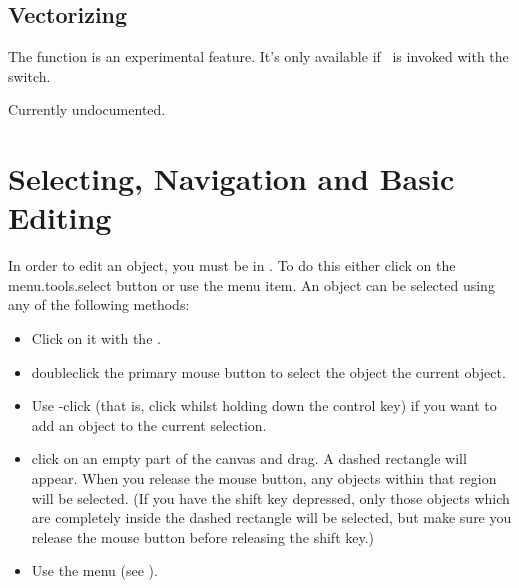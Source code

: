 
\section{Vectorizing}\label{sec:vectorize}

The  function is an experimental
feature. It's only available if \FlowframTk\ is invoked with
the  switch.

Currently undocumented.


\chapter{Selecting, Navigation and Basic Editing}\label{sec:selectobjects}


In order to edit an \gls{object}, you must be in \selectmode. To do
this either click on the \gls{menu.tools.select} button or use the 
 menu item. An \gls*{object} can
be selected using any of the following methods:
\begin{itemize}
\item Click on it with the .

\item \Gls{doubleclick} the primary mouse button to
select the \gls*{object}  the current \gls*{object}.

\item Use -click (that is, \gls{click} whilst holding down the control
 key) if you want to add an \gls*{object} to the current
selection.

\item \Gls{click} on an empty part of the \gls{canvas} and
drag. A dashed rectangle will appear. When you release the mouse
button, any \glspl*{object} within that
region will be selected. (If you have the shift  key depressed,
only those objects which are completely inside the dashed
rectangle will be selected, but make sure you release the mouse
button before releasing the shift key.)

\item Use the  menu (see ).

\end{itemize}


